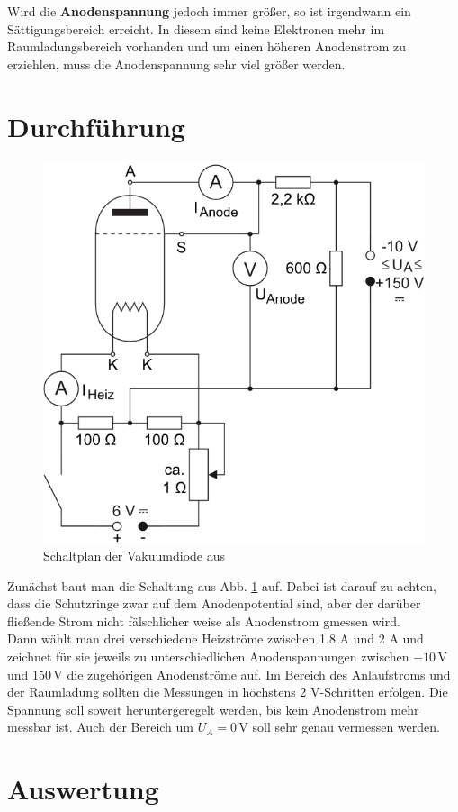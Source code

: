 \documentclass[12pt,a4paper,titlepage,headinclude,bibtotoc]{scrartcl}
\begin{document}
Wird die \textbf{Anodenspannung} jedoch immer größer, so ist irgendwann ein Sättigungsbereich erreicht.
In diesem sind keine Elektronen mehr im Raumladungsbereich vorhanden und um einen höheren Anodenstrom zu erziehlen, muss die Anodenspannung sehr viel größer werden.



\section{Durchführung}
\label{sec:durchfuehrung}
\begin{figure}[!h]
\centering
\includegraphics[width=0.5\linewidth]{aufbau}
\caption{Schaltplan der Vakuumdiode aus \cite[8.10.14, 12 Uhr]{LP17}}
\label{fig:aufbau}
\end{figure}
Zunächst baut man die Schaltung aus Abb. \ref{fig:aufbau} auf.
Dabei ist darauf zu achten, dass die Schutzringe zwar auf dem Anodenpotential sind, aber der darüber fließende Strom nicht fälschlicher weise als Anodenstrom gmessen wird.\\
Dann wählt man drei verschiedene Heizströme zwischen 1.8 A und 2 A und zeichnet für sie jeweils zu unterschiedlichen Anodenspannungen zwischen $-10\,$V und $150\,$V die zugehörigen Anodenströme auf.
Im Bereich des Anlaufstroms und der Raumladung sollten die Messungen in höchstens 2 V-Schritten erfolgen.
Die Spannung soll soweit heruntergeregelt werden, bis kein Anodenstrom mehr messbar ist.
Auch der Bereich um $U_A=0\,$V soll sehr genau vermessen werden.

\section{Auswertung}
\label{sec:auswertung}
\end{document}
